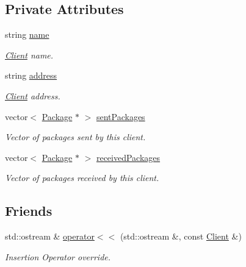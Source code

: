\subsection*{Private Attributes}
\begin{DoxyCompactItemize}
\item 
string \hyperlink{classClient_a456e36f9972a8bf3ecdb5f0e70b3bd5d}{name}\hypertarget{classClient_a456e36f9972a8bf3ecdb5f0e70b3bd5d}{}\label{classClient_a456e36f9972a8bf3ecdb5f0e70b3bd5d}

\begin{DoxyCompactList}\small\item\em \hyperlink{classClient}{Client} name. \end{DoxyCompactList}\item 
string \hyperlink{classClient_a6355d7fc34358ed4ceac7985f7c46e6e}{address}\hypertarget{classClient_a6355d7fc34358ed4ceac7985f7c46e6e}{}\label{classClient_a6355d7fc34358ed4ceac7985f7c46e6e}

\begin{DoxyCompactList}\small\item\em \hyperlink{classClient}{Client} address. \end{DoxyCompactList}\item 
vector$<$ \hyperlink{classPackage}{Package} $\ast$ $>$ \hyperlink{classClient_a2b2adb035b1729e5914a2ff85e672c88}{sent\+Packages}\hypertarget{classClient_a2b2adb035b1729e5914a2ff85e672c88}{}\label{classClient_a2b2adb035b1729e5914a2ff85e672c88}

\begin{DoxyCompactList}\small\item\em Vector of packages sent by this client. \end{DoxyCompactList}\item 
vector$<$ \hyperlink{classPackage}{Package} $\ast$ $>$ \hyperlink{classClient_ae0b61b806652c0dd46a5ef3e0308fb51}{received\+Packages}\hypertarget{classClient_ae0b61b806652c0dd46a5ef3e0308fb51}{}\label{classClient_ae0b61b806652c0dd46a5ef3e0308fb51}

\begin{DoxyCompactList}\small\item\em Vector of packages received by this client. \end{DoxyCompactList}\end{DoxyCompactItemize}
\subsection*{Friends}
\begin{DoxyCompactItemize}
\item 
std\+::ostream \& \hyperlink{classClient_adeb74b47c51aa4da00d60e8ba153a4ed}{operator$<$$<$} (std\+::ostream \&, const \hyperlink{classClient}{Client} \&)\hypertarget{classClient_adeb74b47c51aa4da00d60e8ba153a4ed}{}\label{classClient_adeb74b47c51aa4da00d60e8ba153a4ed}

\begin{DoxyCompactList}\small\item\em Insertion Operator override. \end{DoxyCompactList}\end{DoxyCompactItemize}



